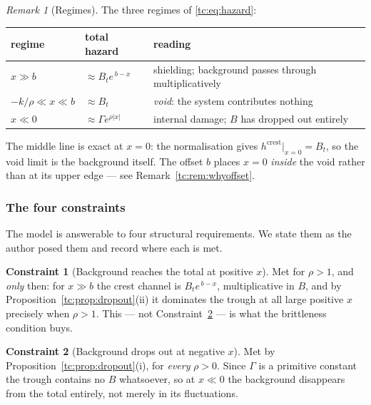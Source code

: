 \documentclass[11pt]{article}
\numberwithin{equation}{section}
\theoremstyle{plain}
\theoremstyle{definition}
\newtheorem{constraint}{Constraint}
\theoremstyle{remark}
\newtheorem{remark}[theorem]{Remark}
\begin{document}
\begin{remark}[Regimes]\label{tc:rem:regimes}
The three regimes of \eqref{tc:eq:hazard}:
\begin{center}\small
\begin{tabular}{@{}lll@{}}
\toprule
regime & total hazard & reading\\
\midrule
$x\gg b$ & $\approx B_te^{\,b-x}$ & shielding; background passes through
multiplicatively\\
$-k/\rho\ll x\ll b$ & $\approx B_t$ & \emph{void}: the system
contributes nothing\\
$x\ll0$ & $\approx\Gamma e^{\rho|x|}$ & internal damage; $B$ has dropped
out entirely\\
\bottomrule
\end{tabular}
\end{center}
The middle line is exact at $x=0$: the normalisation gives
$h^{\mathrm{crest}}|_{x=0}=B_t$, so the void limit is the background
itself. The offset $b$ places $x=0$ \emph{inside} the void rather than
at its upper edge --- see Remark~\ref{tc:rem:whyoffset}.
\end{remark}

\subsubsection{The four constraints}\label{tc:subsub:constraints}

The model is answerable to four structural requirements. We state them
as the author posed them and record where each is met.

\begin{constraint}[Background reaches the total at positive $x$]
\label{tc:C1}
Met for $\rho>1$, and \emph{only} then: for $x\gg b$ the crest channel
is $B_te^{\,b-x}$, multiplicative in $B$, and by
Proposition~\ref{tc:prop:dropout}(ii) it dominates the trough at all
large positive $x$ precisely when $\rho>1$. This --- not
Constraint~\ref{tc:C2} --- is what the brittleness condition buys.
\end{constraint}

\begin{constraint}[Background drops out at negative $x$]\label{tc:C2}
Met by Proposition~\ref{tc:prop:dropout}(i), for \emph{every} $\rho>0$.
Since $\Gamma$ is a primitive constant the trough contains no $B$
whatsoever, so at $x\ll0$ the background disappears from the total
entirely, not merely in its fluctuations.
\end{constraint}
\end{document}
